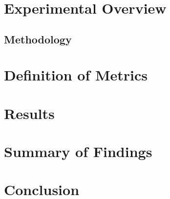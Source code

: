

\label{sec:ch3-motivation}


\section{Experimental Overview}
\label{sec:ch3-study}


\subsection{Methodology}
\label{sec:ch3-methods}


\section{Definition of Metrics}
\label{sec:ch3-metrics}


\section{Results}
\label{sec:ch3-results}


\section{Summary of Findings}
\label{sec:ch3-summary}


\section{Conclusion}
\label{sec:ch3-concl}

